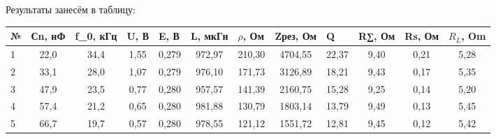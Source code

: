 \documentclass{article}
\begin{document}
Результаты занесём в таблицу: 
\begin{table}[h!]
\begin{tabular}{|lcccc|c|c|c|c|c|c|c|}
\hline
\multicolumn{1}{|l|}{№} & \multicolumn{1}{l|}{Сn, нФ} & \multicolumn{1}{l|}{f\_0, кГц} & \multicolumn{1}{l|}{U, В} & \multicolumn{1}{l|}{E, В} & \multicolumn{1}{l|}{L, мкГн} & \multicolumn{1}{l|}{$\rho$, Ом} & \multicolumn{1}{l|}{Zрез, Ом} & \multicolumn{1}{l|}{Q} & \multicolumn{1}{l|}{R∑, Ом} & \multicolumn{1}{l|}{Rs, Ом} & \multicolumn{1}{l|}{$R_L$, Om} \\ \hline
\multicolumn{1}{|l|}{1} & \multicolumn{1}{c|}{22,0}   & \multicolumn{1}{c|}{34,4}      & \multicolumn{1}{c|}{1,55} & 0,279                     & 972,97                       & 210,30                          & 4704,55                       & 22,37                  & 9,40                        & 0,21                        & 5,28                           \\ \hline
\multicolumn{1}{|l|}{2} & \multicolumn{1}{c|}{33,1}   & \multicolumn{1}{c|}{28,0}      & \multicolumn{1}{c|}{1,07} & 0,279                     & 976,10                       & 171,73                          & 3126,89                       & 18,21                  & 9,43                        & 0,17                        & 5,35                           \\ \hline
\multicolumn{1}{|l|}{3} & \multicolumn{1}{c|}{47,9}   & \multicolumn{1}{c|}{23,5}      & \multicolumn{1}{c|}{0,77} & 0,280                     & 957,57                       & 141,39                          & 2160,75                       & 15,28                  & 9,25                        & 0,14                        & 5,20                           \\ \hline
\multicolumn{1}{|l|}{4} & \multicolumn{1}{c|}{57,4}   & \multicolumn{1}{c|}{21,2}      & \multicolumn{1}{c|}{0,65} & 0,280                     & 981,88                       & 130,79                          & 1803,14                       & 13,79                  & 9,49                        & 0,13                        & 5,45                           \\ \hline
\multicolumn{1}{|l|}{5} & \multicolumn{1}{c|}{66,7}   & \multicolumn{1}{c|}{19,7}      & \multicolumn{1}{c|}{0,57} & 0,280                     & 978,55                       & 121,12                          & 1551,72                       & 12,81                  & 9,45                        & 0,12                        & 5,42                           \\ \hline

\end{tabular}
\end{table}
\end{document}
